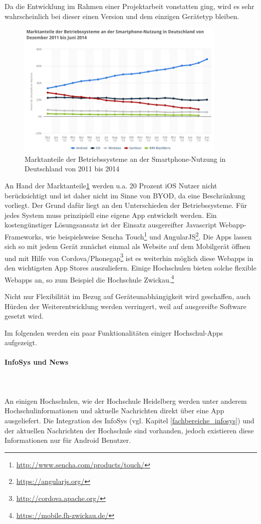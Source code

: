 Da die Entwicklung im Rahmen einer Projektarbeit vonstatten ging, wird es sehr wahrscheinlich bei dieser einen Version und dem einzigen Gerätetyp bleiben.

\begin{figure}[h!]
	\centering
	\includegraphics[width=10cm]{kapitel/gruppe1_2/bilder/marktanteile}
	\caption{Marktanteile der Betriebssysteme an der Smartphone-Nutzung in Deutschland von 2011 bis 2014}\protect \footnotemark
	\label{fig_marktanteile}
\end{figure}

An Hand der Marktanteile\ref{fig_marktanteile} werden u.a. 20 Prozent iOS Nutzer nicht berücksichtigt und ist daher nicht im Sinne von BYOD, da eine Beschränkung vorliegt. Der Grund dafür liegt an den Unterschieden der Betriebssysteme. Für jedes System muss prinzipiell eine eigene App entwickelt werden. Ein kostengünstiger Lösungsansatz ist der Einsatz ausgereifter Javascript Webapp-Frameworks, wie beispielsweise Sencha Touch\footnote{\url{http://www.sencha.com/products/touch/}} und AngularJS\footnote{\url{https://angularjs.org/}}. Die Apps lassen sich so mit jedem Gerät zunächst einmal als Website auf dem Mobilgerät öffnen und mit Hilfe von Cordova/Phonegap\footnote{\url{http://cordova.apache.org/}} ist es weiterhin möglich diese Webapps in den wichtigsten App Stores auszuliefern. Einige Hochschulen bieten solche flexible Webapps an, so zum Beispiel die Hochschule Zwickau.\footnote{\url{https://mobile.fh-zwickau.de/}}

Nicht nur Flexibilität im Bezug auf Geräteunabhängigkeit wird geschaffen, auch Hürden der Weiterentwicklung werden verringert, weil auf ausgereifte Software gesetzt wird.

Im folgenden werden ein paar Funktionalitäten einiger Hochschul-Apps aufgezeigt.

\paragraph{InfoSys und News}\mbox{}\\\\
An einigen Hochschulen, wie der Hochschule Heidelberg werden unter anderem Hochschulinformationen und aktuelle Nachrichten direkt über eine App ausgeliefert. Die Integration des InfoSys (vgl. Kapitel \ref{fachbereiche_infosys}) und der aktuellen Nachrichten der Hochschule sind vorhanden, jedoch existieren diese Informationen nur für Android Benutzer.

